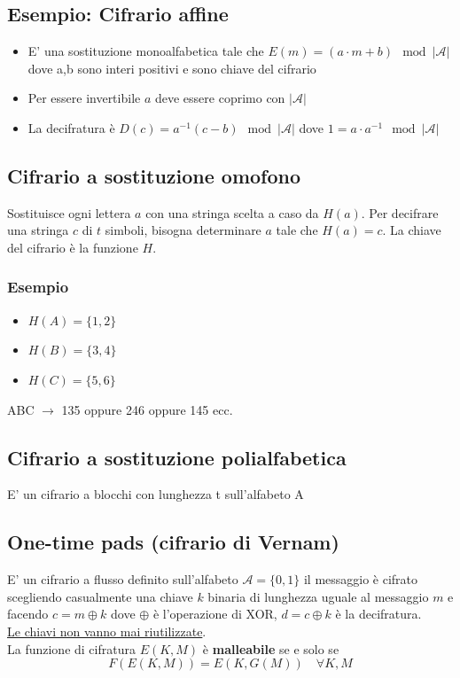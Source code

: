 \documentclass[12pt, a4paper]{report}
\begin{document}
\subsection{Esempio: Cifrario affine}
\begin{itemize}
    \item E' una sostituzione monoalfabetica tale che $E(m)=(a\cdot m+b) \mod |\mathcal{A}|$ dove a,b sono interi positivi e sono chiave del cifrario
    \item Per essere invertibile $a$ deve essere coprimo con $|\mathcal{A}|$
    \item La decifratura è $D(c) = a^{-1}(c-b) \mod |\mathcal{A}|$ dove $1 = a\cdot a^{-1}\mod |\mathcal{A}|$
\end{itemize}
\subsection{Cifrario a sostituzione omofono}
Sostituisce ogni lettera $a$ con una stringa scelta a caso da $H(a)$. Per decifrare una stringa $c$ di $t$ simboli, bisogna determinare $a$ tale che $H(a)=c$. La chiave del cifrario è la funzione $H$.
\subsubsection{Esempio}
\begin{itemize}
    \item $H(A)=\{1,2\}$
    \item $H(B)=\{3,4\}$
    \item $H(C)=\{5,6\}$
\end{itemize}
ABC $\rightarrow$ 135 oppure 246 oppure 145 ecc.
\subsection{Cifrario a sostituzione polialfabetica}
E' un cifrario a blocchi con lunghezza t sull'alfabeto A
\subsection{One-time pads (cifrario di Vernam)}
E' un cifrario a flusso definito sull'alfabeto $\mathcal{A}=\{0,1\}$  il messaggio è cifrato scegliendo casualmente una chiave $k$ binaria di lunghezza uguale al messaggio $m$ e facendo $c=m\oplus k$ dove $\oplus$ è l'operazione di XOR, $d=c\oplus k$ è la decifratura.\\
\underline{Le chiavi non vanno mai riutilizzate}.\\
La funzione di cifratura $E(K,M)$ è \textbf{malleabile} se e solo se
\begin{equation*}
    F(E(K,M)) = E(K,G(M)) \quad\forall K,M
\end{equation*}
\end{document}
